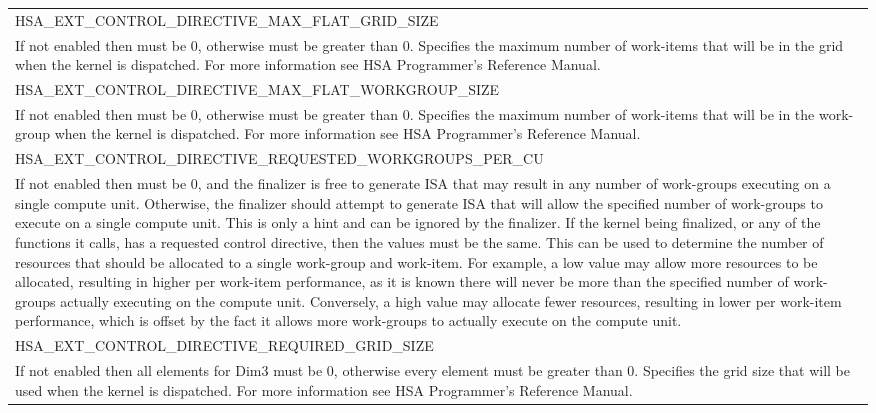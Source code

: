 \documentclass[final]{book}
\newcommand{\reftyp}[1]{#1}
\newcommand{\refenu}[1]{\reftyp{#1}}
\begin{document}
\begin{longtable}{@{\hspace{2em}}p{\linewidth-2em}}
\hspace{-2em}\refenu{HSA_\-EXT_\-CONTROL_\-DIRECTIVE_\-MAX_\-FLAT_\-GRID_\-SIZE}\\If not enabled then must be 0, otherwise must be greater than 0. Specifies the maximum number of work-items that will be in the grid when the kernel is dispatched. For more information see HSA Programmer's Reference Manual.\\[2mm]
\hspace{-2em}\refenu{HSA_\-EXT_\-CONTROL_\-DIRECTIVE_\-MAX_\-FLAT_\-WORKGROUP_\-SIZE}\\If not enabled then must be 0, otherwise must be greater than 0. Specifies the maximum number of work-items that will be in the work-group when the kernel is dispatched. For more information see HSA Programmer's Reference Manual.\\[2mm]
\hspace{-2em}\refenu{HSA_\-EXT_\-CONTROL_\-DIRECTIVE_\-REQUESTED_\-WORKGROUPS_\-PER_\-CU}\\If not enabled then must be 0, and the finalizer is free to generate ISA that may result in any number of work-groups executing on a single compute unit. Otherwise, the finalizer should attempt to generate ISA that will allow the specified number of work-groups to execute on a single compute unit. This is only a hint and can be ignored by the finalizer. If the kernel being finalized, or any of the functions it calls, has a requested control directive, then the values must be the same. This can be used to determine the number of resources that should be allocated to a single work-group and work-item. For example, a low value may allow more resources to be allocated, resulting in higher per work-item performance, as it is known there will never be more than the specified number of work-groups actually executing on the compute unit. Conversely, a high value may allocate fewer resources, resulting in lower per work-item performance, which is offset by the fact it allows more work-groups to actually execute on the compute unit.\\[2mm]
\hspace{-2em}\refenu{HSA_\-EXT_\-CONTROL_\-DIRECTIVE_\-REQUIRED_\-GRID_\-SIZE}\\If not enabled then all elements for Dim3 must be 0, otherwise every element must be greater than 0. Specifies the grid size that will be used when the kernel is dispatched. For more information see HSA Programmer's Reference Manual.\\[2mm]

\end{longtable}
\end{document}

